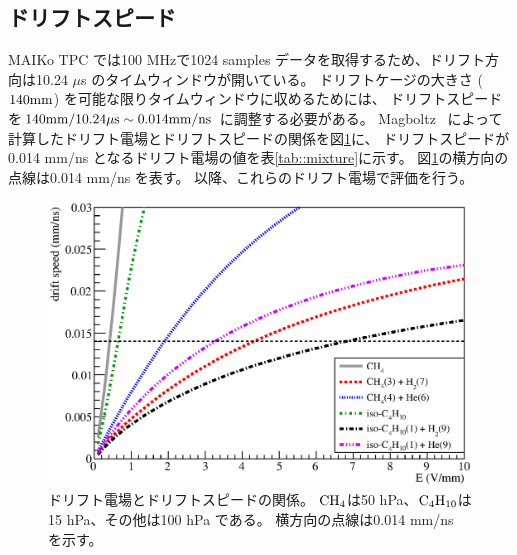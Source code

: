 \documentclass[../master]{subfiles}
\begin{document}
\subsection{ドリフトスピード}
MAIKo TPC では100 MHzで1024 samples データを取得するため、ドリフト方向は10.24 $\mu$s のタイムウィンドウが開いている。
ドリフトケージの大きさ ($140\rm{mm}$) を可能な限りタイムウィンドウに収めるためには、
ドリフトスピードを$140\rm{mm}/10.24\rm{\mu s} \sim 0.014\rm{mm/ns}$ に調整する必要がある。
Magboltz~\cite{magboltz} によって計算したドリフト電場とドリフトスピードの関係を図\ref{fig::drift_v_magboltz}に、
ドリフトスピードが0.014 mm/ns となるドリフト電場の値を表\ref{tab::mixture}に示す。
図\ref{fig::drift_v_magboltz}の横方向の点線は0.014 mm/ns を表す。
以降、これらのドリフト電場で評価を行う。
\begin{figure}
  \centering
  \includegraphics[clip, width=0.9\columnwidth]{drift_v_magboltz.eps}
  \caption[ドリフト電場とドリフトスピードの関係。]
          {ドリフト電場とドリフトスピードの関係。
            ${\rm CH_{4}}$は50 hPa、${\rm C_{4}H_{10}}$は15 hPa、その他は100 hPa である。
          横方向の点線は0.014 mm/ns を示す。}
  \label{fig::drift_v_magboltz}
\end{figure}
\end{document}
